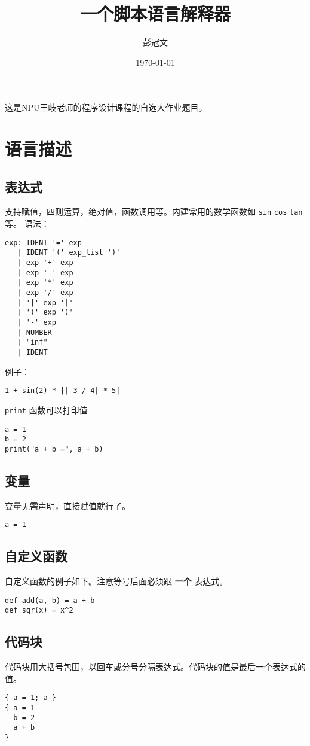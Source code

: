 \documentclass[UTF8]{ctexart}
\author{彭冠文}
\date{\today}
\title{一个脚本语言解释器}
\begin{document}
\maketitle
\tableofcontents

这是NPU王岐老师的程序设计课程的自选大作业题目。

\section{语言描述}
\label{sec:org7ac6f48}

\subsection{表达式}
\label{sec:org295ddb2}
支持赋值，四则运算，绝对值，函数调用等。内建常用的数学函数如 \texttt{sin} \texttt{cos} \texttt{tan} 等。
语法：
\begin{verbatim}
exp: IDENT '=' exp         
   | IDENT '(' exp_list ')'
   | exp '+' exp           
   | exp '-' exp           
   | exp '*' exp           
   | exp '/' exp           
   | '|' exp '|'           
   | '(' exp ')'           
   | '-' exp
   | NUMBER                
   | "inf"
   | IDENT                 
\end{verbatim}
例子：
\begin{verbatim}
1 + sin(2) * ||-3 / 4| * 5|
\end{verbatim}

\texttt{print} 函数可以打印值
\begin{verbatim}
a = 1
b = 2
print("a + b =", a + b)
\end{verbatim}

\subsection{变量}
\label{sec:org9149477}
变量无需声明，直接赋值就行了。
\begin{verbatim}
a = 1
\end{verbatim}

\subsection{自定义函数}
\label{sec:org31eea38}
自定义函数的例子如下。注意等号后面必须跟 \textbf{一个} 表达式。
\begin{verbatim}
def add(a, b) = a + b
def sqr(x) = x^2
\end{verbatim}

\subsection{代码块}
\label{sec:orgbd4e733}
代码块用大括号包围，以回车或分号分隔表达式。代码块的值是最后一个表达式的值。
\begin{verbatim}
{ a = 1; a }
{ a = 1
  b = 2
  a + b
}
\end{verbatim}
\end{document}
